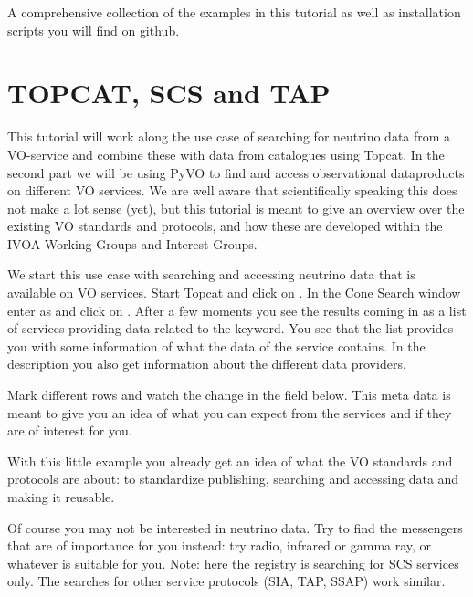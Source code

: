 \documentclass[twoside]{article}[12pt]
\begin{document}
A comprehensive collection of the examples in this tutorial as well as
installation scripts you will find on
\href{https://github.com/hendhd/ivoa_newcomers}{github}. 

\section {TOPCAT, SCS and TAP}
This tutorial will work along the use case of searching for neutrino
data from a VO-service and combine these with data from catalogues using
Topcat. In the second part we will be using PyVO to find and access
observational dataproducts on different VO services.
We are well aware that scientifically speaking this does not make a lot
sense (yet), but this tutorial is meant to give an overview over the
existing VO standards and protocols, and how these are developed within
the IVOA Working Groups and Interest Groups. 



We start this use case with searching and accessing neutrino data
that is available on VO services. Start Topcat and click on
\goto {}. In the Cone Search window enter
 as  and click on .
After a few moments you see the results coming in as a list of services
providing data related to the keyword. You see that the list provides
you with some information of what the data of the service contains. In
the description you also get information about the different data
providers.

\REGISTRYSTD

Mark different rows and watch the  change in the field below. This meta data is meant to give you an idea of what you can expect from the services and if they are of
interest for you.

With this little example you already get an idea of what the VO
standards and protocols are about: to standardize publishing, searching and
accessing data and making it reusable. 


\begin{exercise}Of course you may not be interested in neutrino data.
Try to find the messengers that are of importance for you instead: try radio,
infrared or gamma ray, or whatever is suitable for you. Note: here the
registry is searching for SCS services only. The searches for other
service protocols (SIA, TAP, SSAP) work similar. 
\end{exercise}
\end{document}
